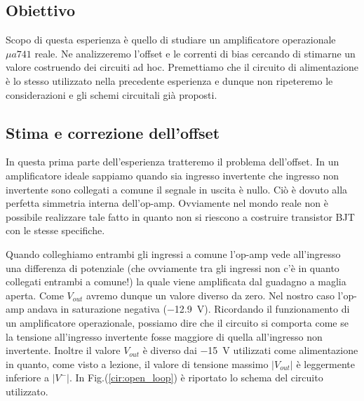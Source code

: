 \subsection{Obiettivo}
Scopo di questa esperienza è quello di studiare un amplificatore operazionale $\mu a 741$ reale. Ne analizzeremo l'offset e le correnti di bias cercando di stimarne un valore costruendo dei circuiti ad hoc. Premettiamo che il circuito di alimentazione è lo stesso utilizzato nella precedente esperienza e dunque non ripeteremo le considerazioni e gli schemi circuitali già proposti. 



\subsection{Stima e correzione dell'offset}

In questa prima parte dell'esperienza tratteremo il problema dell'offset. In un amplificatore ideale sappiamo quando sia ingresso invertente che ingresso non invertente sono collegati a comune il segnale in uscita è nullo. Ciò è dovuto alla perfetta simmetria interna dell'op-amp. Ovviamente nel mondo reale non è possibile realizzare tale fatto in quanto non si riescono a costruire transistor BJT con le stesse specifiche. 

Quando colleghiamo entrambi gli ingressi a comune l'op-amp vede all'ingresso una differenza di potenziale (che ovviamente tra gli ingressi non c'è in quanto collegati entrambi a comune!) la quale viene amplificata dal guadagno a maglia aperta. Come $V_{out}$ avremo dunque un valore diverso da zero. Nel nostro caso l'op-amp andava in saturazione negativa (\SI{-12.9}{\volt}). Ricordando il funzionamento di un amplificatore operazionale, possiamo dire che il circuito si comporta come se la tensione all'ingresso invertente fosse maggiore di quella all'ingresso non invertente. Inoltre il valore $V_{out}$ è diverso dai \SI{-15}{\volt} utilizzati come alimentazione in quanto, come visto a lezione, il valore di tensione massimo $|V_{out}|$ è leggermente inferiore a $|V^-|$. In Fig.(\ref{cir:open_loop}) è riportato lo schema del circuito utilizzato.


